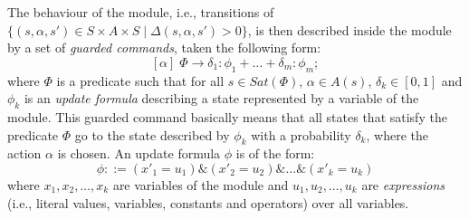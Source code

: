 The behaviour of the module, i.e., transitions of $\{ (s, \alpha, s') \in S \times A \times S \; | \; \Delta(s, \alpha, s') > 0 \}$, is then described
inside the module by a set of \textit{guarded commands}, taken the following form:
\[
  [\alpha] \; \Phi \rightarrow \delta_1: \phi_1 + \dots + \delta_m: \phi_m;
\]
where $\Phi$ is a predicate such that for all $s \in Sat(\Phi)$, $\alpha \in A(s)$, $\delta_k \in [0, 1]$ and $\phi_k$ is an \textit{update formula} describing a state represented by a variable of the module. This guarded command basically means that all states that satisfy the predicate $\Phi$ go to the state  described by $\phi_k$ with a probability $\delta_k$, where the action $\alpha$ is chosen.
An update formula $\phi$ is of the form:
\[\phi::=(x'_1=u_1) \& (x'_2=u_2) \& \dots \& (x'_k=u_k)\]
where $x_1, x_2, \dots, x_k$ are variables of the module and $u_1, u_2, \dots, u_k$ are \textit{expressions} (i.e., literal values, variables, constants and operators) over all variables.
